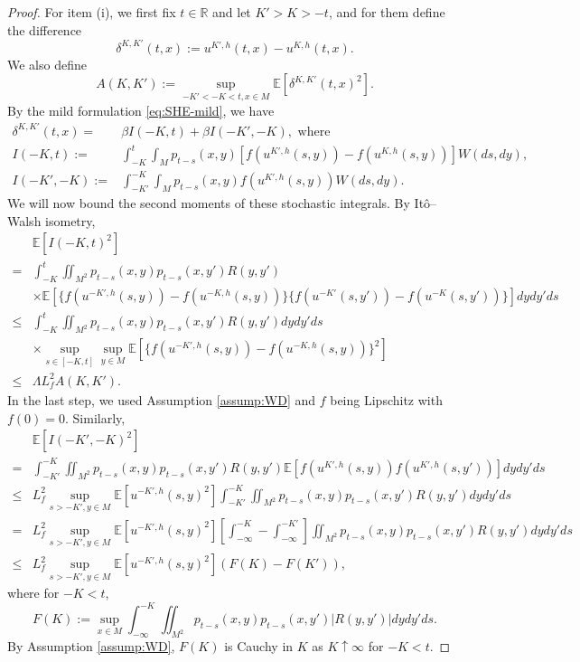 \documentclass{article}
\numberwithin{theorem}{section}
\def\text{\mbox}
\def\RR{\mathbb{R}} %
\def\EE{\mathbb{E}} %
\begin{document}
\begin{proof}
For item (i), we first fix $t\in\RR$ and let $K'>K>-t$, and for them define the difference
\[
\delta^{K,K'}(t,x)
:= u^{K',h}(t,x) - u^{K,h}(t,x).
\]
We also define \[A(K,K'):= \sup_{-K'<-K<t,x\in M}\EE[\delta^{K,K'}(t,x)^2].\] 
By the mild formulation \eqref{eq:SHE-mild}, we have \begin{align*}
    \delta^{K,K'}(t,x)=&\beta I(-K,t)+\beta I(-K',-K),\text{ where }\\
    I(-K,t):=&\int_{-K}^t\int_M p_{t-s}(x,y)[f(u^{K',h}(s,y))-f(u^{K,h}(s,y))] W(ds,dy),\\
    I(-K',-K):=&\int_{-K'}^{-K}\int_M p_{t-s}(x,y)f(u^{K',h}(s,y)) W(ds,dy).
\end{align*}
We will now bound the second moments of these stochastic integrals. By It\^o--Walsh isometry, \begin{align*}
    &\EE[I(-K,t)^2]\\
    =&\int_{-K}^t\iint_{M^2} p_{t-s}(x,y)p_{t-s}(x,y')R(y,y')\\
    &\times \EE[\{f(u^{-K',h}(s,y))-f(u^{-K,h}(s,y))\}\{f(u^{-K'}(s,y'))-f(u^{-K}(s,y'))\}] dydy'ds\\
    \leq& \int_{-K}^t\iint_{M^2} p_{t-s}(x,y)p_{t-s}(x,y')R(y,y')dydy'ds\\
    &\times \sup_{s\in [-K,t]}\sup_{y\in M}\EE[\{f(u^{-K',h}(s,y))-f(u^{-K,h}(s,y))\}^2]\\
    \leq& \Lambda L_f^2 A(K,K').
\end{align*}
In the last step, we used Assumption \ref{assump:WD} and $f$ being Lipschitz with $f(0)=0$.
Similarly, \begin{align*}
    &\EE[I(-K',-K)^2]\\
    =&\int_{-K'}^{-K}\iint_{M^2} p_{t-s}(x,y)p_{t-s}(x,y')R(y,y')\EE[f(u^{K',h}(s,y))f(u^{K',h}(s,y'))] dydy'ds\\
    \leq& L_f^2\sup_{s>-K',y\in M}\EE[u^{-K',h}(s,y)^2]\int_{-K'}^{-K}\iint_{M^2} p_{t-s}(x,y)p_{t-s}(x,y')R(y,y') dydy'ds\\
    =& L_f^2\sup_{s>-K',y\in M}\EE[u^{-K',h}(s,y)^2]\left[\int_{-\infty}^{-K}-\int_{-\infty}^{-K'}\right]\iint_{M^2} p_{t-s}(x,y)p_{t-s}(x,y')R(y,y') dydy'ds\\
    \leq& L_f^2\sup_{s>-K',y\in M}\EE[u^{-K',h}(s,y)^2] (F(K)-F(K')),
\end{align*}
where for $-K<t$, \[F(K):=\sup_{x\in M}\int_{-\infty}^{-K}\iint_{M^2} p_{t-s}(x,y)p_{t-s}(x,y')|R(y,y')| dydy'ds.\] By Assumption \ref{assump:WD}, $F(K)$ is Cauchy in $K$ as $K\uparrow\infty$ for $-K<t$. 

\end{proof}
\end{document}
